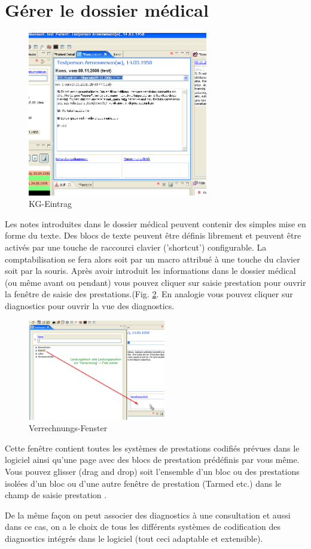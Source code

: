\section{Gérer le dossier médical}
\begin{figure}
    \begin{center}
	   \includegraphics[width=0.7\textwidth]{images/einf6}
    	\caption{KG-Eintrag}
	   \label{fig:KG}
    \end{center}
\end{figure}
Les notes introduites dans le dossier médical peuvent contenir des simples mise en forme du texte. Des blocs de texte peuvent être définis librement et peuvent être activés par une touche de raccourci clavier ('shortcut') configurable.
La comptabilisation se fera alors soit par un macro attribué à une touche du clavier soit par la souris. Après avoir introduit les informations dans le dossier médical (ou même avant ou pendant) vous pouvez cliquer sur \glqq saisie prestation\grqq{} pour ouvrir la fenêtre de saisie des prestations.(Fig. \ref{fig:Verrechnung}. En analogie vous pouvez cliquer sur \glqq diagnostics\grqq{} pour ouvrir la vue des diagnostics.

\begin{figure}[ht]
	\includegraphics[width=6cm]{images/einf7}
	\caption{Verrechnungs-Fenster}
	\label{fig:Verrechnung}
\end{figure}
Cette fenêtre contient toutes les systèmes de prestations codifiés prévues dans le logiciel ainsi qu'une page avec des blocs de prestation prédéfinis par vous même.
Vous pouvez glisser (drag and drop) soit l'ensemble d'un bloc ou des prestations isolées d'un bloc ou d'une autre fenêtre de prestation (Tarmed etc.) dans le champ de
 \glqq saisie prestation \grqq{}.

De la même façon on peut associer des diagnostics à une consultation et aussi dans ce cas, on a le choix de tous les différents systèmes de codification des diagnostics intégrés dans le logiciel (tout ceci adaptable et extensible).

\clearpage
